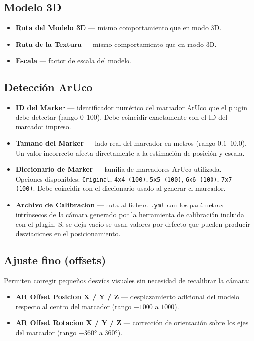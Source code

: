 \subsection*{Modelo 3D}

\begin{itemize}
  \item \textbf{Ruta del Modelo 3D} — mismo comportamiento que en modo 3D.
  \item \textbf{Ruta de la Textura} — mismo comportamiento que en modo 3D.
  \item \textbf{Escala} — factor de escala del modelo.
\end{itemize}

\subsection*{Detección ArUco}

\begin{itemize}
  \item \textbf{ID del Marker} — identificador numérico del marcador ArUco que el plugin debe detectar (rango $0$--$100$). Debe coincidir exactamente con el ID del marcador impreso.
  \item \textbf{Tamano del Marker} — lado real del marcador en metros (rango $0.1$--$10.0$). Un valor incorrecto afecta directamente a la estimación de posición y escala.
  \item \textbf{Diccionario de Marker} — familia de marcadores ArUco utilizada. Opciones disponibles: \texttt{Original}, \texttt{4x4 (100)}, \texttt{5x5 (100)}, \texttt{6x6 (100)}, \texttt{7x7 (100)}. Debe coincidir con el diccionario usado al generar el marcador.
  \item \textbf{Archivo de Calibracion} — ruta al fichero \texttt{.yml} con los parámetros intrínsecos de la cámara generado por la herramienta de calibración incluida con el plugin. Si se deja vacío se usan valores por defecto que pueden producir desviaciones en el posicionamiento.
\end{itemize}

\subsection*{Ajuste fino (offsets)}

Permiten corregir pequeños desvíos visuales sin necesidad de recalibrar la cámara:

\begin{itemize}
  \item \textbf{AR Offset Posicion X / Y / Z} — desplazamiento adicional del modelo respecto al centro del marcador (rango $-1000$ a $1000$).
  \item \textbf{AR Offset Rotacion X / Y / Z} — corrección de orientación sobre los ejes del marcador (rango $-360°$ a $360°$).
\end{itemize}

